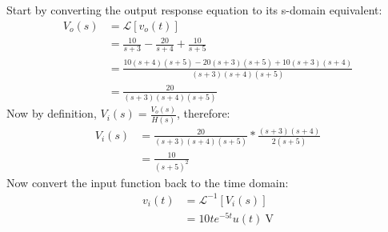 Start by converting the output response equation to its s-domain equivalent:
\begin{align*}
	V_o(s) &= \mathcal{L}[v_o(t)] \\
	&= \frac{10}{s+3} - \frac{20}{s+4} + \frac{10}{s+5} \\
	&= \frac{10(s+4)(s+5) - 20(s+3)(s+5) + 10(s+3)(s+4)}{(s+3)(s+4)(s+5)} \\
	&= \frac{20}{(s+3)(s+4)(s+5)}
\end{align*}
Now by definition, $V_i(s) = \frac{V_o(s)}{H(s)}$, therefore:
\begin{align*}
	V_i(s) &= \frac{20}{(s+3)(s+4)(s+5)} * \frac{(s+3)(s+4)}{2(s+5)} \\
	&= \frac{10}{(s+5)^2}
\end{align*}
Now convert the input function back to the time domain:
\begin{align*}
	v_i(t) &= \mathcal{L}^{-1}[V_i(s)] \\
	&= 10te^{-5t} u(t) \ \mathrm{V}
	\\
\end{align*}

